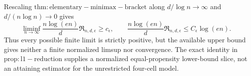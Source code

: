 Rescaling \(\mathrm{thm:elementary-minimax-bracket}\) along \(d/\log n\to\infty\) and \(d/(n\log n)\to0\) gives
\[
 \liminf_{n\to\infty}\frac{n\log(en)}d\mathfrak R_{n,d,\epsilon}\ge c_\epsilon,
 \qquad
 \frac{n\log(en)}d\mathfrak R_{n,d,\epsilon}
 \le C_\epsilon\log(en).
\]
Thus every possible finite limit is strictly positive, but the available upper bound gives neither a finite normalized limsup nor convergence.  The exact identity in \(\mathrm{prop:l1-reduction}\) supplies a normalized equal-propensity lower-bound slice, not an attaining estimator for the unrestricted four-cell model.